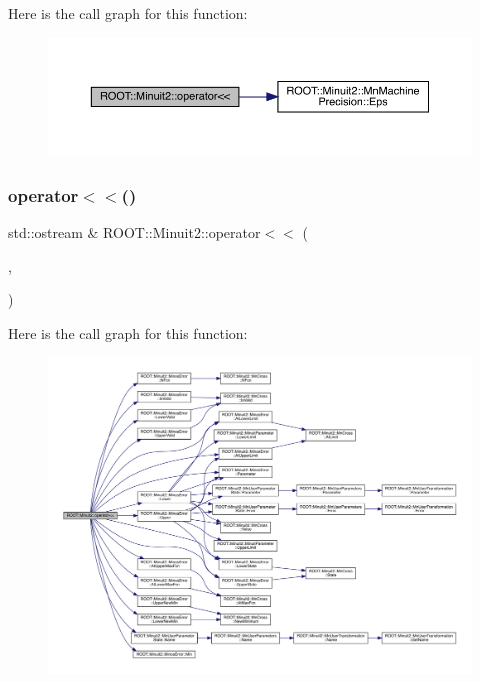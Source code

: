 Here is the call graph for this function\+:
\nopagebreak
\begin{figure}[H]
\begin{center}
\leavevmode
\includegraphics[width=350pt]{d6/d3a/namespaceROOT_1_1Minuit2_a490766f2dd62363c6729e716a8da5da8_cgraph}
\end{center}
\end{figure}
\mbox{\label{namespaceROOT_1_1Minuit2_a21121467830697f28cd9d979108c44dd}} 
\subsubsection{\texorpdfstring{operator$<$$<$()}{operator<<()}\hspace{0.1cm}{\footnotesize\ttfamily [10/11]}}
{\footnotesize\ttfamily std\+::ostream \& R\+O\+O\+T\+::\+Minuit2\+::operator$<$$<$ (\begin{DoxyParamCaption}\item[{std\+::ostream \&}]{,  }\item[{const \mbox{\hyperlink{classROOT_1_1Minuit2_1_1MinosError}{Minos\+Error}} \&}]{ }\end{DoxyParamCaption})}

Here is the call graph for this function\+:
\nopagebreak
\begin{figure}[H]
\begin{center}
\leavevmode
\includegraphics[width=350pt]{d6/d3a/namespaceROOT_1_1Minuit2_a21121467830697f28cd9d979108c44dd_cgraph}
\end{center}
\end{figure}
\mbox{\label{namespaceROOT_1_1Minuit2_a5f32b6f73f8b284fbc74fbf211a7b4ac}} 
